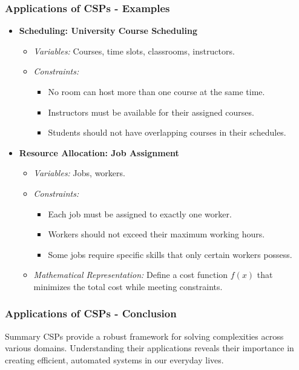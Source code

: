 \documentclass[aspectratio=169]{beamer}
\begin{document}
\begin{frame}[fragile]
    \frametitle{Applications of CSPs - Examples}
    \begin{itemize}
        \item \textbf{Scheduling: University Course Scheduling}
        \begin{itemize}
            \item \textit{Variables:} Courses, time slots, classrooms, instructors.
            \item \textit{Constraints:} 
            \begin{itemize}
                \item No room can host more than one course at the same time.
                \item Instructors must be available for their assigned courses.
                \item Students should not have overlapping courses in their schedules.
            \end{itemize}
        \end{itemize}
        
        \item \textbf{Resource Allocation: Job Assignment}
        \begin{itemize}
            \item \textit{Variables:} Jobs, workers.
            \item \textit{Constraints:}
            \begin{itemize}
                \item Each job must be assigned to exactly one worker.
                \item Workers should not exceed their maximum working hours.
                \item Some jobs require specific skills that only certain workers possess.
            \end{itemize}
            \item \textit{Mathematical Representation:} Define a cost function $f(x)$ that minimizes the total cost while meeting constraints.
        \end{itemize}
    \end{itemize}
\end{frame}

\begin{frame}[fragile]
    \frametitle{Applications of CSPs - Conclusion}
    \begin{block}{Summary}
        CSPs provide a robust framework for solving complexities across various domains. Understanding their applications reveals their importance in creating efficient, automated systems in our everyday lives.
    \end{block}
\end{frame}
\end{document}
